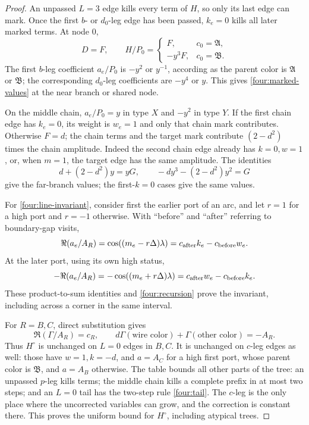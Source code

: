 \begin{proof}
An unpassed $L=3$ edge kills every term of $H$, so only its last edge
can mark.  Once the first $b$- or $d_0$-leg edge has been passed,
$k_e=0$ kills all later marked terms.  At node $0$,
\begin{equation}
 D=F,\qquad H/P_0=
 \begin{cases}F,&c_0=\mathfrak A,\\-y^3F,&c_0=\mathfrak B.
 \end{cases}
 \label{four:branch-values}
\end{equation}
The first $b$-leg coefficient $a_e/P_0$ is $-y^2$ or $y^{-1}$,
according as the parent color is $\mathfrak A$ or $\mathfrak B$;
the corresponding $d_0$-leg coefficients are $-y^4$ or $y$.
This gives \eqref{four:marked-values} at the near branch or shared node.

On the middle chain, $a_e/P_0=y$ in type $X$ and $-y^2$ in type $Y$.
If the first chain edge has $k_e=0$, its weight is $w_e=1$ and only
that chain mark contributes.  Otherwise $F=d$; the chain terms and
the target mark contribute $(2-d^2)$ times the chain amplitude.
Indeed the second chain edge already has $k=0,w=1$, or, when $m=1$,
the target edge has the same amplitude.  The identities
\begin{equation}
 d+(2-d^2)y=yG,\qquad
 -dy^3-(2-d^2)y^2=G
 \label{four:far-algebra}
\end{equation}
give the far-branch values; the first-$k=0$ cases give the same values.

For \eqref{four:line-invariant}, consider first the earlier port of an
arc, and let $r=1$ for a high port and $r=-1$ otherwise.  With
``before'' and ``after'' referring to boundary-gap visits,
\begin{equation}
 \Re(a_e/A_R)=\cos((m_e-r\Delta)\lambda)
       =c_{\rm after}k_e-c_{\rm before}w_e.
 \label{four:early-port}
\end{equation}
At the later port, using its own high status,
\begin{equation}
 -\Re(a_e/A_R)=-\cos((m_e+r\Delta)\lambda)
       =c_{\rm after}w_e-c_{\rm before}k_e.
 \label{four:late-port}
\end{equation}
These product-to-sum identities and \eqref{four:recursion} prove the
invariant, including across a corner in the same interval.

For $R=B,C$, direct substitution gives
\begin{equation}
 \Re(\Gamma/A_R)=c_R,\qquad
 d\Gamma(\text{wire color})+\Gamma(\text{other color})=-A_R.
 \label{four:Gamma-identities}
\end{equation}
Thus $H^\circ$ is unchanged on $L=0$ edges in $B,C$.  It is unchanged
on $c$-leg edges as well: those have $w=1,k=-d$, and $a=A_C$ for
a high first port, whose parent color is $\mathfrak B$, and $a=A_B$
otherwise.  The table bounds all other parts of the tree: an unpassed
$p$-leg kills terms; the middle chain kills a complete prefix in at most
two steps; and an $L=0$ tail has the two-step rule
\eqref{four:tail}.  The $c$-leg is the only place where the uncorrected
variables can grow, and the correction is constant there.  This proves
the uniform bound for $H^\circ$, including atypical trees.


\end{proof}

